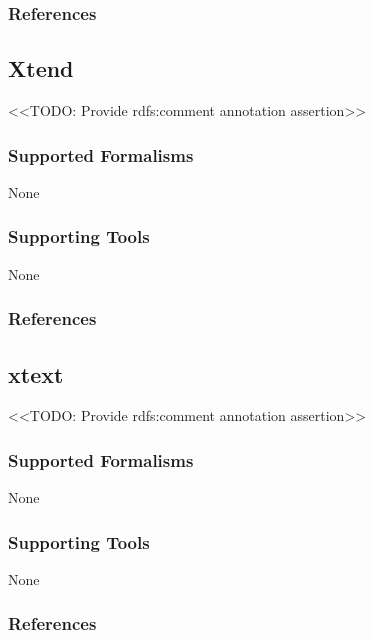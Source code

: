 \subsubsection{References}





\subsection{Xtend}
\label{subsecL:Xtend}

<<TODO: Provide rdfs:comment annotation assertion>>

\subsubsection{Supported Formalisms}

None


\subsubsection{Supporting Tools}

None


\subsubsection{References}





\subsection{xtext}
\label{subsecL:xtext}

<<TODO: Provide rdfs:comment annotation assertion>>

\subsubsection{Supported Formalisms}

None


\subsubsection{Supporting Tools}

None


\subsubsection{References}
